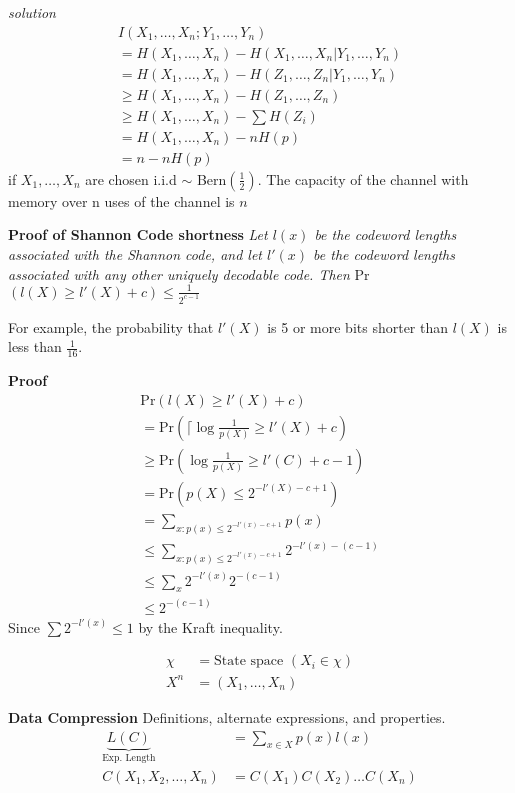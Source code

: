 \documentclass[10pt]{article}
\begin{document}
\begin{tiny}
\begin{multicols}{3}
{\it solution} 
\begin{eqnarray*}
I(X_{1},\ldots,X_{n};Y_{1},\ldots,Y_{n})\\
= H(X_{1},\ldots,X_{n})-H(X_{1},\ldots,X_{n}|Y_{1},\ldots,Y_{n})\\
= H(X_{1},\ldots,X_{n}) - H(Z_{1},\ldots,Z_{n}|Y_{1},\ldots,Y_{n})\\
\geq H(X_{1},\ldots,X_{n}) - H(Z_{1},\ldots,Z_{n})\\
\geq H(X_{1},\ldots,X_{n}) - \sum H(Z_{i})\\
=H(X_{1},\ldots,X_{n}) - nH(p)\\
=n - nH(p)
\end{eqnarray*}
if $X_{1},\ldots,X_{n}$ are chosen i.i.d $\sim$ Bern$\left( \frac{1}{2}\right)$. The capacity of the channel with memory over n uses of the channel is $n$


\textbf{\scriptsize Proof of Shannon Code shortness}
{\it Let $l(x)$ be the codeword lengths associated with the Shannon code, and let $l'(x)$ be the codeword lengths associated with any other uniquely decodable code. Then} Pr$(l(X) \geq l'(X) + c)\leq \frac{1}{2^{c-1}}$

For example, the probability that $l'(X)$ is 5 or more bits shorter than $l(X)$ is less than $\frac{1}{16}$. 

{\bf Proof}
\begin{eqnarray*}
\text{Pr}(l(X) \geq l'(X) + c)\\
=\text{Pr}\left(\lceil \log \frac{1}{p(X)} \geq l'(X) + c \right)\\
\geq \text{Pr}\left( \log \frac{1}{p(X)} \geq l'(C) + c - 1 \right)\\
=\text{Pr}\left( p(X) \leq 2^{-l'(X)-c+1}\right)\\
=\sum_{x:p(x)\leq 2^{-l'(x)-c+1}} p(x)\\
\leq \sum_{x:p(x)\leq 2^{-l'(x)-c+1}}2^{-l'(x)-(c-1)} \\
\leq \sum_{x}2^{-l'(x)}2^{-(c-1)}\\
\leq 2^{-(c-1)}
\end{eqnarray*}
Since $\sum 2^{-l'(x)} \leq 1$ by the Kraft inequality.

\begin{align*}
\chi &= \text{State space } (X_i \in \chi) \\
X^n &=(X_1,\ldots,X_n) 
\end{align*}


\textbf{\scriptsize Data Compression}
Definitions, alternate expressions, and properties.
\begin{align}
    \underbrace{L(C)}_\text{Exp. Length}&= \sum_{x\in X} p(x)l(x) \label{defn: Exp. Length}\\
C(X_1,X_2,\ldots,X_n) &= C(X_1)C(X_2)\ldots C(X_n)
\end{align}


\end{multicols}
\end{tiny}
\end{document}
